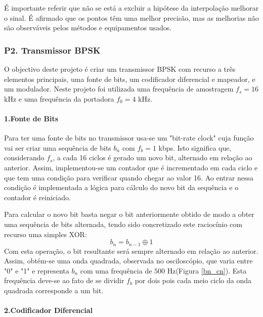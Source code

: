 \documentclass[11pt]{article}
\numberwithin{equation}{section}
\begin{document}
É importante referir que não se está a excluir a hipótese da interpolação melhorar o sinal. É afirmado que os pontos têm uma melhor precisão, mas as melhorias não são observáveis pelos métodos e equipamentos usados.

\subsubsection{P2. Transmissor BPSK}

O objectivo deste projeto é criar um transmissor BPSK com recurso a três elementos principais, uma fonte de bits, um codificador diferencial e mapeador, e um modulador.
Neste projeto foi utilizada uma frequência de amostragem $f_s=16$ kHz e uma frequência da portadora $f_0=4$ kHz.

\paragraph{1.Fonte de Bits} \hspace{0pt}

Para ter uma fonte de bits no transmissor usa-se um "bit-rate clock" cuja função vai ser criar uma sequência de bits $ b_n $ com $f_b=1$ kbps. Isto significa que, considerando $f_s$, a cada 16 ciclos é gerado um novo bit, alternado em relação ao anterior. Assim, implementou-se um contador que é incrementado em cada ciclo  e que tem uma condição para verificar quando chegar ao valor 16. Ao entrar nessa condição é implementada a lógica para cálculo do novo bit da sequência e o contador é reiniciado.

Para calcular o novo bit basta negar o bit anteriormente obtido de modo a obter uma sequência de bits alternada, tendo sido concretizado este raciocínio com recurso uma simples XOR:
\begin{equation}
b_n=b_{n-1} \oplus 1
\end{equation}
Com esta operação, o bit resultante será sempre alternado em relação ao anterior.
Assim, obtém-se uma onda quadrada, observada no osciloscópio, que varia entre "0" e "1" e representa $ b_n $  com uma frequência de $500$ Hz(Figura \ref{bn_cn}). Esta frequência deve-se ao fato de se dividir  $f_b$ por dois pois cada meio ciclo da onda quadrada corresponde a um bit.  

\paragraph{2.Codificador Diferencial} \hspace{0pt}
\end{document}
